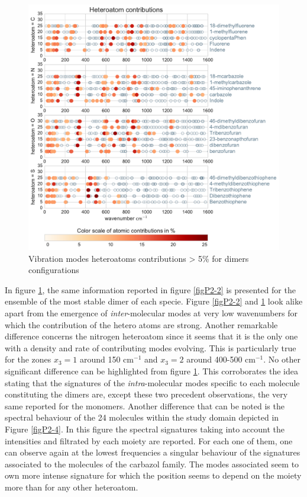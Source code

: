 	
	
	
		\begin{figure}[H]
			\begin{center}
				\includegraphics[scale=0.55]{image/P2-3}
			\end{center}
			\caption{Vibration modes heteroatoms contributions > 5\% for dimers configurations}  \label{figP2-3}
		\end{figure}
	
	
In figure \ref{figP2-3}, the same information reported in figure \ref{figP2-2} is presented for the ensemble of the most stable dimer of each specie. Figure \ref{figP2-2} and \ref{figP2-3} look alike apart from the emergence of \textit{inter}-molecular modes at very low wavenumbers for which the contribution of the hetero atoms are strong. Another remarkable difference concerns the nitrogen heteroatom since it seems that it is the only one with a density and rate of contributing modes evolving. This is particularly true for the zones $x_3=1$ around 150 cm$^{-1}$ and $x_3=2$ around 400-500 cm$^{-1}$. No other significant difference can be highlighted from figure \ref{figP2-3}. This corroborates the idea stating that the signatures of the \textit{intra}-molecular modes specific to each molecule constituting the dimers are, except these two precedent observations, the very same reported for the monomers. 
Another difference that can be noted is the spectral behaviour of the 24 molecules within the study domain depicted in Figure \ref{figP2-4}. In this figure the spectral signatures taking into account the intensities and filtrated by each moiety are reported. For each one of them, one can observe again at the lowest frequencies a singular behaviour of the signatures associated to the molecules of the carbazol family. The modes associated seem to own more intense signature for which the position seems to depend on the moiety more than for any other heteroatom.	
	
